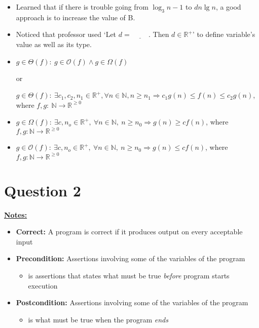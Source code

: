 \documentclass[12pt]{article}
\begin{document}
\bigskip

\begin{itemize}
    \item Learned that if there is trouble going from $\log_3n - 1$ to $dn\lg n$,
    a good approach is to increase the value of B.
    \item Noticed that professor used `Let $d = \underline{\hspace{1cm}}$. Then $d \in \mathbb{R}^+$'
    to define variable's value as well as its type.
    \item
    $g \in \Theta(f):\: g \in \mathcal{O}(f) \land g \in \Omega(f)$

    or

    $g \in \Theta(f):\:\exists c_1,c_2,n_1 \in \mathbb{R}^{+}, \forall n \in \mathbb{N}, n \geq n_1
    \Rightarrow c_1g(n) \leq f(n) \leq c_2g(n)$, where $f,g:\:\mathbb{N} \to \mathbb{R}^{\geq 0}$

    \item
    $g \in \Omega(f):\:\exists c,n_o \in \mathbb{R}^{+},\:\forall n \in
    \mathbb{N},\:n \geq n_0 \Rightarrow g(n) \geq cf(n)$, where $f,g:\mathbb{N} \to \mathbb{R}^{\geq 0}$

    \item

    $g \in \mathcal{O}(f):\:\exists c,n_o \in \mathbb{R}^{+},\:\forall n \in
    \mathbb{N},\:n \geq n_0 \Rightarrow g(n) \leq cf(n)$, where $f,g:\mathbb{N} \to \mathbb{R}^{\geq 0}$
\end{itemize}

\bigskip

\section*{Question 2}

\bigskip

\underline{\textbf{Notes:}}

\bigskip

\begin{itemize}
    \item \textbf{Correct:} A program is correct if it produces output on every acceptable input
    \item \textbf{Precondition:} Assertions involving some of the variables of the program
    \begin{itemize}
        \item is assertions that states what must be true \textit{before} program starts execution
    \end{itemize}

    \item \textbf{Postcondition:} Assertions involving some of the variables of the program
    \begin{itemize}
        \item is what must be true when the program \textit{ends}
    \end{itemize}
\end{itemize}
\end{document}
